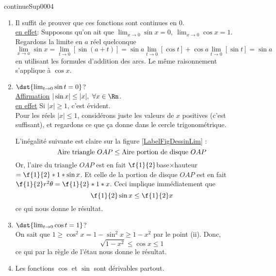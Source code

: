
\begin{corrige}{continueSup0004}

\begin{enumerate}
\item  Il suffit de prouver que ces fonctions sont continues en $0$.\\
\underline{en effet}: Supposons qu'on ait que $\lim_{x\rightarrow  0} \sin x = 0, \ \lim_{x\rightarrow  0} \cos x = 1$. Regardons la limite  en $a$ réel quelconque
\[
	\lim_{x\rightarrow  a} \sin x= \lim_{t\rightarrow  0}[ \sin (a+t)] = \sin a \lim_{t\rightarrow  0}[ \cos t] + \cos a \lim_{t\rightarrow  0} [\sin  t] = \sin a
\]
en utilisant les formules d'addition des arcs. Le même raisonnement s'applique à $\cos x$. 


\item $\dst{\lim_{t\rightarrow  0} \sin t  =0}$?\\
\underline{Affirmation} $|\sin x| \leq |x|, \ \forall x \in \Rn$.\\
\underline{en effet} Si $|x|\geq 1$, c'est évident.\\
Pour les réels $|x|\leq 1$, considérons juste les valeurs de $x$ positives (c'est suffisant), et regardons ce que \c{c}a donne dans le cercle trigonométrique.

\newcommand{\CaptionFigDessinLim}{Dessin qui permet de calculer quelque limites.}


L'inégalité suivante est claire sur la figure \ref{LabelFigDessinLim} :
\[ {\rm Aire \ triangle \ }  OAP \leq {\rm Aire \  portion \  de \  disque \ } OAP\]
Or, l'aire du triangle $OAP$ est en fait $\f{1}{2}$base$\times$hauteur $= \f{1}{2}*1*\sin x$. Et celle de la portion de disque $OAP$ est en fait $\f{1}{2}r^2\theta = \f{1}{2}*1* x$. Ceci implique immédiatement que 
\[\f{1}{2}\sin x \leq \f{1}{2} x\] ce qui nous donne le résultat.

\item $\dst{\lim_{t\rightarrow  0} \cos t  =1}$?\\

On sait que $1\geq \cos^2 x = 1-\sin^2 x \geq 1-x^2$ par le point (ii). Donc, 
\[
\sqrt{1-x^2}\leq \cos x \leq 1
\] ce qui par la règle de l'étau nous donne le résultat.

\item Les fonctions $\cos $ et $\sin$ sont dérivables partout. \\



\end{enumerate}
\end{corrige}
